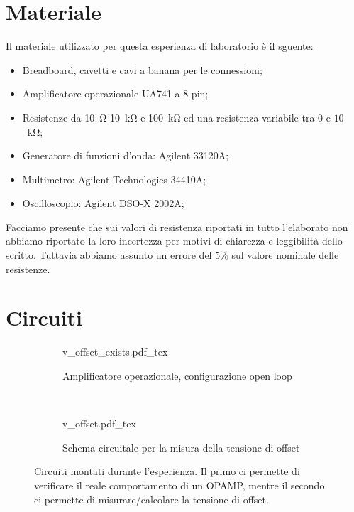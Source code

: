 \section*{Materiale}

Il materiale utilizzato per questa esperienza di laboratorio è il sguente:

\begin{itemize} \itemsep2pt \parskip0pt 
    \item{Breadboard, cavetti e cavi a banana per le connessioni;}
    \item{Amplificatore operazionale UA741 a 8 pin;}
    \item{Resistenze da \SI{10}{\ohm} \SI{10}{\kilo\ohm} e \SI{100}{\kilo\ohm} ed una resistenza variabile tra $0$ e $10$ \SI{}{\kilo\ohm};}
    \item{Generatore di funzioni d'onda: Agilent 33120A;}
    \item{Multimetro: Agilent Technologies 34410A;}
    \item{Oscilloscopio: Agilent DSO-X 2002A;}
\end{itemize}

Facciamo presente che sui valori di resistenza riportati in tutto l'elaborato non abbiamo riportato la loro incertezza per motivi di chiarezza e leggibilità dello scritto. Tuttavia abbiamo assunto un errore del $5\%$ sul valore nominale delle resistenze.

\section*{Circuiti}

\begin{figure}[h]
        \centering
        \begin{subfigure}[b]{0.48\textwidth}
        		\def\svgwidth{\textwidth}
                {v_offset_exists.pdf_tex}
                \caption{Amplificatore operazionale, configurazione open loop}
                \label{fig:open_loop}
        \end{subfigure}
        ~
        \begin{subfigure}[b]{0.48\textwidth}
        		\def\svgwidth{\textwidth}
                {v_offset.pdf_tex}
                \caption{Schema circuitale per la misura della tensione di offset}
                \label{fig:offset}
        \end{subfigure}
        \caption{Circuiti montati durante l'esperienza. Il primo ci permette di verificare il reale comportamento di un OPAMP, mentre il secondo ci permette di misurare/calcolare la tensione di offset.}
\end{figure}
